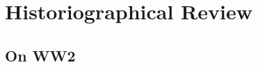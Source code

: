 \documentclass[noraggedright]{turabian-researchpaper}
\begin{document}
%
%
%
%
%
%
%
\section{Historiographical Review}





	\subsection{On WW2} %
\end{document}
